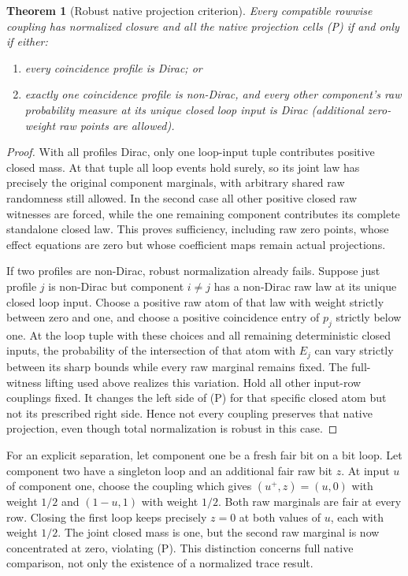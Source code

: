 \documentclass[11pt]{article}
\newtheorem{theorem}{Theorem}\newtheorem{proposition}[theorem]{Proposition}\newtheorem{lemma}[theorem]{Lemma}
\begin{document}
\begin{theorem}[Robust native projection criterion]
Every compatible rowwise coupling has normalized closure and all the native projection cells (P) if and only if either:
\begin{enumerate}
\item every coincidence profile is Dirac; or
\item exactly one coincidence profile is non-Dirac, and every other component's raw probability measure at its unique closed loop input is Dirac (additional zero-weight raw points are allowed).
\end{enumerate}
\end{theorem}
\begin{proof}
With all profiles Dirac, only one loop-input tuple contributes positive closed mass. At that tuple all loop events hold surely, so its joint law has precisely the original component marginals, with arbitrary shared raw randomness still allowed. In the second case all other positive closed raw witnesses are forced, while the one remaining component contributes its complete standalone closed law. This proves sufficiency, including raw zero points, whose effect equations are zero but whose coefficient maps remain actual projections.

If two profiles are non-Dirac, robust normalization already fails. Suppose just profile $j$ is non-Dirac but component $i\ne j$ has a non-Dirac raw law at its unique closed loop input. Choose a positive raw atom of that law with weight strictly between zero and one, and choose a positive coincidence entry of $p_j$ strictly below one. At the loop tuple with these choices and all remaining deterministic closed inputs, the probability of the intersection of that atom with $E_j$ can vary strictly between its sharp bounds while every raw marginal remains fixed. The full-witness lifting used above realizes this variation. Hold all other input-row couplings fixed. It changes the left side of (P) for that specific closed atom but not its prescribed right side. Hence not every coupling preserves that native projection, even though total normalization is robust in this case.
\end{proof}

For an explicit separation, let component one be a fresh fair bit on a bit loop. Let component two have a singleton loop and an additional fair raw bit $z$. At input $u$ of component one, choose the coupling which gives $(u^+,z)=(u,0)$ with weight $1/2$ and $(1-u,1)$ with weight $1/2$. Both raw marginals are fair at every row. Closing the first loop keeps precisely $z=0$ at both values of $u$, each with weight $1/2$. The joint closed mass is one, but the second raw marginal is now concentrated at zero, violating (P). This distinction concerns full native comparison, not only the existence of a normalized trace result.
\end{document}
